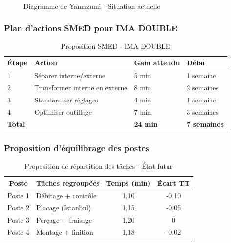 \documentclass[12pt,a4paper]{article}
\begin{document}
\begin{center}
\begin{figure}[H]
\caption{Diagramme de Yamazumi - Situation actuelle}
\label{fig:ynion_yamazumi}
\end{figure}

\subsubsection{Plan d'actions SMED pour IMA DOUBLE}

\begin{table}[H]
\centering
\caption{Proposition SMED - IMA DOUBLE}
\label{tab:ynion_smed}
\begin{tabular}{|p{3cm}|p{4cm}|p{4cm}|p{2cm}|}
\hline
\textbf{Étape} & \textbf{Action} & \textbf{Gain attendu} & \textbf{Délai} \\ \hline
1 & Séparer interne/externe & 5 min & 1 semaine \\ \hline
2 & Transformer interne en externe & 8 min & 2 semaines \\ \hline
3 & Standardiser réglages & 4 min & 1 semaine \\ \hline
4 & Optimiser outillage & 7 min & 3 semaines \\ \hline
\textbf{Total} & & \textbf{24 min} & \textbf{7 semaines} \\ \hline
\end{tabular}
\end{table}

\subsubsection{Proposition d'équilibrage des postes}

\begin{table}[H]
\centering
\caption{Proposition de répartition des tâches - État futur}
\label{tab:ynion_equilibrage}
\begin{tabular}{|c|l|c|c|}
\hline
\textbf{Poste} & \textbf{Tâches regroupées} & \textbf{Temps (min)} & \textbf{Écart TT} \\ \hline
Poste 1 & Débitage + contrôle & 1,10 & -0,10 \\ \hline
Poste 2 & Placage (Istanbul) & 1,15 & -0,05 \\ \hline
Poste 3 & Perçage + fraisage & 1,20 & 0 \\ \hline
Poste 4 & Montage + finition & 1,18 & -0,02 \\ \hline
\end{tabular}
\end{table}


\end{center}
\end{document}
